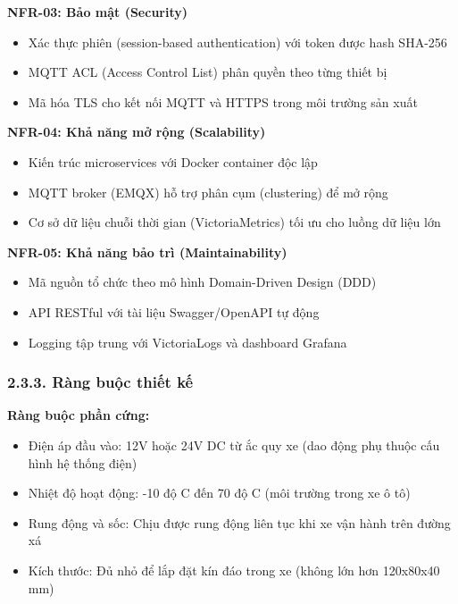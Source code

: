 \documentclass[13pt,a4paper]{extarticle}
\renewcommand{\\}{\thesislongtableorignewline\hline}%
\providecommand{\tightlist}{%
  \setlength{\itemsep}{0pt}\setlength{\parskip}{0pt}}
\begin{document}
\textbf{NFR-03: Bảo mật (Security)}

\begin{itemize}
\tightlist
\item
  Xác thực phiên (session-based authentication) với token được hash
  SHA-256
\item
  MQTT ACL (Access Control List) phân quyền theo từng thiết bị
\item
  Mã hóa TLS cho kết nối MQTT và HTTPS trong môi trường sản xuất
\end{itemize}

\textbf{NFR-04: Khả năng mở rộng (Scalability)}

\begin{itemize}
\tightlist
\item
  Kiến trúc microservices với Docker container độc lập
\item
  MQTT broker (EMQX) hỗ trợ phân cụm (clustering) để mở rộng
\item
  Cơ sở dữ liệu chuỗi thời gian (VictoriaMetrics) tối ưu cho luồng dữ
  liệu lớn
\end{itemize}

\textbf{NFR-05: Khả năng bảo trì (Maintainability)}

\begin{itemize}
\tightlist
\item
  Mã nguồn tổ chức theo mô hình Domain-Driven Design (DDD)
\item
  API RESTful với tài liệu Swagger/OpenAPI tự động
\item
  Logging tập trung với VictoriaLogs và dashboard Grafana
\end{itemize}

\subsubsection{2.3.3. Ràng buộc thiết
kế}\label{233-ruxe0ng-buux1ed9c-thiux1ebft-kux1ebf}

\textbf{Ràng buộc phần cứng:}

\begin{itemize}
\tightlist
\item
  Điện áp đầu vào: 12V hoặc 24V DC từ ắc quy xe (dao động phụ thuộc cấu
  hình hệ thống điện)
\item
  Nhiệt độ hoạt động: -10 độ C đến 70 độ C (môi trường trong xe ô tô)
\item
  Rung động và sốc: Chịu được rung động liên tục khi xe vận hành trên
  đường xá
\item
  Kích thước: Đủ nhỏ để lắp đặt kín đáo trong xe (không lớn hơn
  120x80x40 mm)
\end{itemize}
\end{document}
